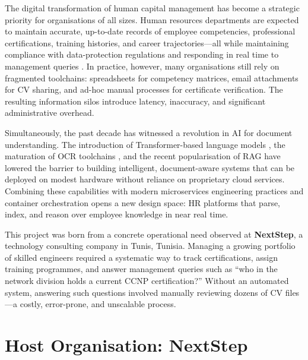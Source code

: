 \documentclass[12pt,a4paper,oneside,openany]{report}
\begin{document}
The digital transformation of human capital management has become a strategic priority for organisations of all sizes. Human resources departments are expected to maintain accurate, up-to-date records of employee competencies, professional certifications, training histories, and career trajectories---all while maintaining compliance with data-protection regulations and responding in real time to management queries \cite{kavanagh2017human}. In practice, however, many organisations still rely on fragmented toolchains: spreadsheets for competency matrices, email attachments for \ac{CV} sharing, and ad-hoc manual processes for certificate verification. The resulting information silos introduce latency, inaccuracy, and significant administrative overhead.

Simultaneously, the past decade has witnessed a revolution in \acl{AI} for document understanding. The introduction of Transformer-based language models \cite{devlin2019bert}, the maturation of \ac{OCR} toolchains \cite{smith2007overview}, and the recent popularisation of \ac{RAG} \cite{lewis2020retrieval} have lowered the barrier to building intelligent, document-aware systems that can be deployed on modest hardware without reliance on proprietary cloud services. Combining these capabilities with modern microservices engineering practices \cite{newman2021microservices} and container orchestration \cite{merkel2014docker} opens a new design space: HR platforms that parse, index, and reason over employee knowledge in near real time.

This project was born from a concrete operational need observed at \textbf{NextStep}, a technology consulting company in Tunis, Tunisia. Managing a growing portfolio of skilled engineers required a systematic way to track certifications, assign training programmes, and answer management queries such as ``who in the network division holds a current CCNP certification?'' Without an automated system, answering such questions involved manually reviewing dozens of \ac{CV} files---a costly, error-prone, and unscalable process.

\section{Host Organisation: NextStep}
\end{document}
